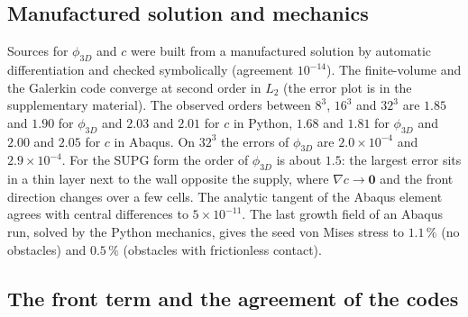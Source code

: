 \documentclass[11pt,a4paper]{article}
\newcommand{\phiD}{\phi_{3D}}
\begin{document}
\subsection{Manufactured solution and mechanics}
\label{app:mms}

Sources for $\phiD$ and $c$ were built from a manufactured solution \citep{Roache2002MMS} by automatic differentiation and checked symbolically (agreement $10^{-14}$). The finite-volume and the Galerkin code converge at second order in $L_2$ (the error plot is in the supplementary material). The observed orders between $8^3$, $16^3$ and $32^3$ are $1.85$ and $1.90$ for $\phiD$ and $2.03$ and $2.01$ for $c$ in Python, $1.68$ and $1.81$ for $\phiD$ and $2.00$ and $2.05$ for $c$ in Abaqus. On $32^3$ the errors of $\phiD$ are $2.0\times10^{-4}$ and $2.9\times10^{-4}$. For the SUPG form the order of $\phiD$ is about $1.5$: the largest error sits in a thin layer next to the wall opposite the supply, where $\nabla c\to\mathbf 0$ and the front direction changes over a few cells. The analytic tangent of the Abaqus element agrees with central differences to $5\times10^{-11}$. The last growth field of an Abaqus run, solved by the Python mechanics, gives the seed von Mises stress to $1.1\,\%$ (no obstacles) and $0.5\,\%$ (obstacles with frictionless contact).

\subsection{The front term and the agreement of the codes}
\label{app:front}
\end{document}
